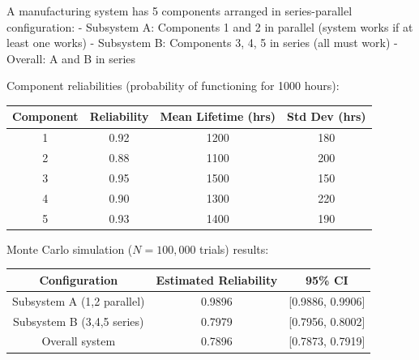 \documentclass[12pt]{article}
\begin{document}
A manufacturing system has 5 components arranged in series-parallel configuration:
- Subsystem A: Components 1 and 2 in parallel (system works if at least one works)
- Subsystem B: Components 3, 4, 5 in series (all must work)
- Overall: A and B in series

Component reliabilities (probability of functioning for 1000 hours):

\begin{center}
\begin{tabular}{cccc}
\toprule
Component & Reliability & Mean Lifetime (hrs) & Std Dev (hrs) \\
\midrule
1 & 0.92 & 1200 & 180 \\
2 & 0.88 & 1100 & 200 \\
3 & 0.95 & 1500 & 150 \\
4 & 0.90 & 1300 & 220 \\
5 & 0.93 & 1400 & 190 \\
\bottomrule
\end{tabular}
\end{center}

Monte Carlo simulation ($N = 100,000$ trials) results:

\begin{center}
\begin{tabular}{ccc}
\toprule
Configuration & Estimated Reliability & 95\% CI \\
\midrule
Subsystem A (1,2 parallel) & 0.9896 & [0.9886, 0.9906] \\
Subsystem B (3,4,5 series) & 0.7979 & [0.7956, 0.8002] \\
Overall system & 0.7896 & [0.7873, 0.7919] \\
\bottomrule
\end{tabular}
\end{center}
\end{document}
